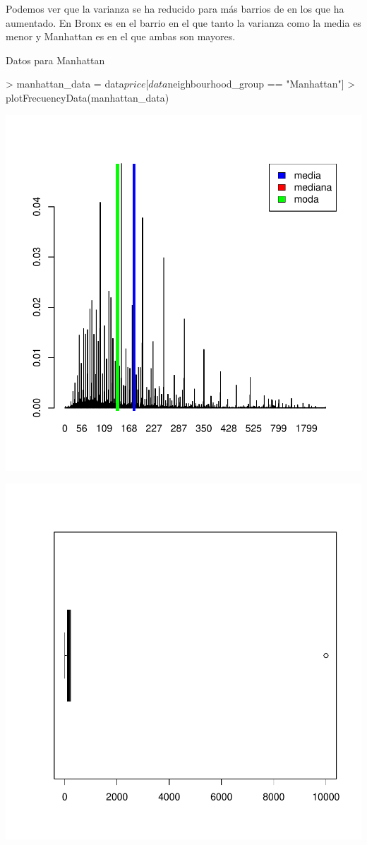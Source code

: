 \documentclass [a4paper] {article}
\begin{document}
\begin{center}
Podemos ver que la varianza se ha reducido para más barrios de en los que ha aumentado.
En Bronx es en el barrio en el que tanto la varianza como la media es menor y 
Manhattan es en el que ambas son mayores.

Datos para Manhattan
\begin{center}
\begin{Schunk}
\begin{Sinput}
> manhattan_data = data$price[data$neighbourhood_group == "Manhattan"]
> plotFrecuencyData(manhattan_data)
\end{Sinput}
\end{Schunk}
\includegraphics{entrega-029}
\end{center}
\begin{center}
\includegraphics{entrega-030}
\end{center}


\end{center}
\end{document}
